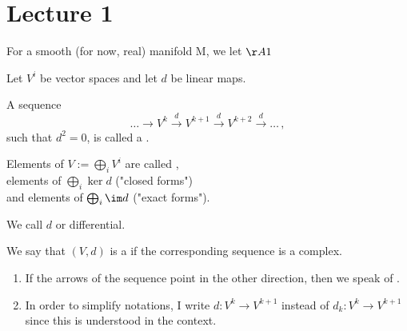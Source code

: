 \section{Lecture 1}
For a smooth (for now, real) manifold M, we let $\AA1$
\begin{dfn} \label{DfnCochainComplex}
    Let $V^i$ be vector spaces and let $d$ be linear maps.

    A sequence
    $$
     \ldots \rightarrow V^k \xrightarrow{d} V^{k+1} \xrightarrow{d} V^{k+2}
     \xrightarrow{d} \ldots \, ,
    $$
    such that $d^2=0$, is called a .

    \medskip

    Elements of $ V := \bigoplus_i{V^i} $ are called , \\
    elements of $ \bigoplus_i{\ker d} $  ("closed forms") \\
    and elements of $ \bigoplus_i{\im d} $  ("exact forms").

    \medskip

    We call $d$  or differential.

    We say that $ (V,d) $ is a  if the corresponding sequence is a complex.
\end{dfn}

\begin{rem}
    \begin{enumerate}
    \item If the arrows of the sequence point in the other direction, then we speak of .
    \item In order to simplify notations, I write $ d: V^k \to V^{k+1} $ instead of $ d_k: V^k \to V^{k+1} $ since this is understood in the context.
    \end{enumerate}
\end{rem}
